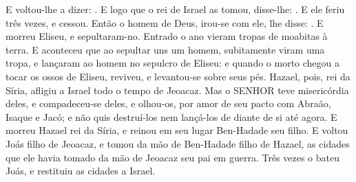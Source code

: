 {  E voltou-lhe a dizer: . E logo que o rei de Israel as tomou, disse-lhe: . E ele feriu três vezes, e cessou.
  Então o homem de Deus, irou-se com ele, lhe disse: .
  E morreu Eliseu, e sepultaram-no. Entrado o ano vieram tropas de moabitas à terra.
  E aconteceu que ao sepultar uns um homem, subitamente viram uma tropa, e lançaram ao homem no sepulcro de Eliseu: e quando o morto chegou a tocar os ossos de Eliseu, reviveu, e levantou-se sobre seus pés.
  Hazael, pois, rei da Síria, afligiu a Israel todo o tempo de Jeoacaz.
  Mas o SENHOR teve misericórdia deles, e compadeceu-se deles, e olhou-os, por amor de seu pacto com Abraão, Isaque e Jacó; e não quis destruí-los nem lançá-los de diante de si até agora.
  E morreu Hazael rei da Síria, e reinou em seu lugar Ben-Hadade seu filho.
  E voltou Joás filho de Jeoacaz, e tomou da mão de Ben-Hadade filho de Hazael, as cidades que ele havia tomado da mão de Jeoacaz seu pai em guerra. Três vezes o bateu Joás, e restituiu as cidades a Israel.
\par }

